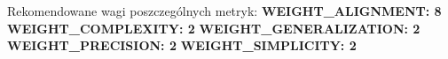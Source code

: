 Rekomendowane wagi poszczególnych metryk: 
\textbf{WEIGHT\_ALIGNMENT:              8} \newline
\textbf{WEIGHT\_COMPLEXITY:              2} \newline
\textbf{WEIGHT\_GENERALIZATION:          2} \newline
\textbf{WEIGHT\_PRECISION:               2} \newline
\textbf{WEIGHT\_SIMPLICITY:              2} \newline
